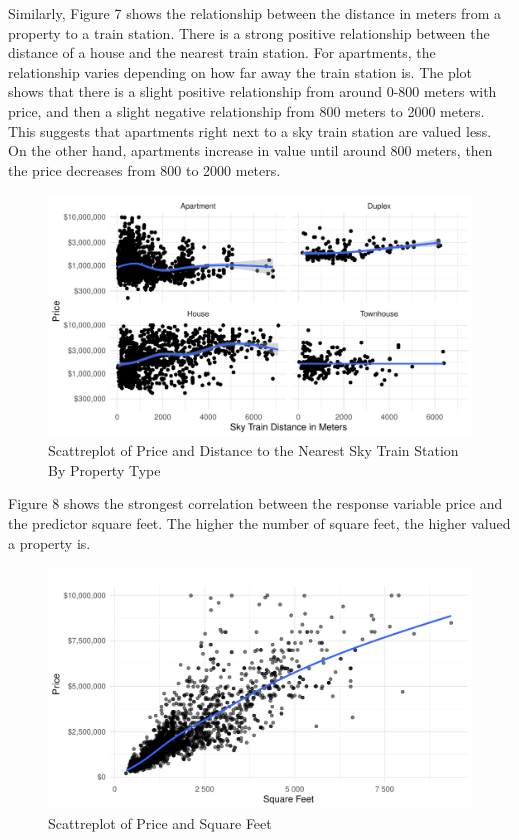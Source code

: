 \documentclass[
]{article}
\begin{document}
Similarly, Figure 7 shows the relationship between the distance in
meters from a property to a train station. There is a strong positive
relationship between the distance of a house and the nearest train
station. For apartments, the relationship varies depending on how far
away the train station is. The plot shows that there is a slight
positive relationship from around 0-800 meters with price, and then a
slight negative relationship from 800 meters to 2000 meters. This
suggests that apartments right next to a sky train station are valued
less. On the other hand, apartments increase in value until around 800
meters, then the price decreases from 800 to 2000 meters.

\begin{figure}
\centering
\includegraphics{final_report_files/figure-latex/unnamed-chunk-10-1.pdf}
\caption{Scattreplot of Price and Distance to the Nearest Sky Train
Station By Property Type}
\end{figure}

Figure 8 shows the strongest correlation between the response variable
price and the predictor square feet. The higher the number of square
feet, the higher valued a property is.

\begin{figure}
\centering
\includegraphics{final_report_files/figure-latex/unnamed-chunk-11-1.pdf}
\caption{Scattreplot of Price and Square Feet}
\end{figure}
\end{document}
